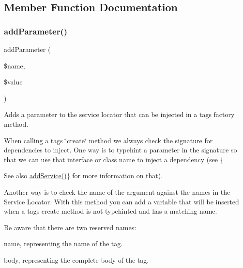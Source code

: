 \subsection{Member Function Documentation}
\mbox{\label{classphp_documentor_1_1_reflection_1_1_doc_block_1_1_standard_tag_factory_a866abdd2dc807cd23873af01cb41f4c6}} 
\subsubsection{\texorpdfstring{add\+Parameter()}{addParameter()}}
{\footnotesize\ttfamily add\+Parameter (\begin{DoxyParamCaption}\item[{}]{\$name,  }\item[{}]{\$value }\end{DoxyParamCaption})}

Adds a parameter to the service locator that can be injected in a tag\textquotesingle{}s factory method.

When calling a tag\textquotesingle{}s \char`\"{}create\char`\"{} method we always check the signature for dependencies to inject. One way is to typehint a parameter in the signature so that we can use that interface or class name to inject a dependency (see \{\begin{DoxySeeAlso}{See also}
\mbox{\hyperlink{interfacephp_documentor_1_1_reflection_1_1_doc_block_1_1_tag_factory_ab7aabcd2f0ab70d9ee3f6cc9ee1441d7}{add\+Service()}}\} for more information on that).
\end{DoxySeeAlso}
Another way is to check the name of the argument against the names in the Service Locator. With this method you can add a variable that will be inserted when a tag\textquotesingle{}s create method is not typehinted and has a matching name.

Be aware that there are two reserved names\+:


\begin{DoxyItemize}
\item name, representing the name of the tag.
\item body, representing the complete body of the tag.
\end{DoxyItemize}

